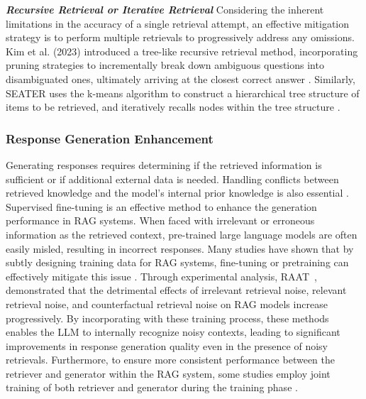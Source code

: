 \textit{\textbf{Recursive Retrieval or Iterative Retrieval}}
Considering the inherent limitations in the accuracy of a single retrieval attempt, an effective mitigation strategy is to perform multiple retrievals to progressively address any omissions. Kim et al. (2023) introduced a tree-like recursive retrieval method, incorporating pruning strategies to incrementally break down ambiguous questions into disambiguated ones, ultimately arriving at the closest correct answer \cite{kim2023tree}. Similarly, SEATER uses the k-means algorithm to construct a hierarchical tree structure of items to be retrieved, and iteratively recalls nodes within the tree structure \cite{si2023generative}.



\subsubsection{Response Generation Enhancement}
Generating responses requires determining if the retrieved information is sufficient or if additional external data is needed. Handling conflicts between retrieved knowledge and the model's internal prior knowledge is also essential \cite{wu2024faithful, ding2024retrieve, tan2024blinded}. Supervised fine-tuning is an effective method to enhance the generation performance in RAG systems. When faced with irrelevant or erroneous information as the retrieved context, pre-trained large language models are often easily misled, resulting in incorrect responses. Many studies have shown that by subtly designing training data for RAG systems, fine-tuning or pretraining can effectively mitigate this issue \cite{wang2023instructretro, yoran2023making, fang2024enhancing}. Through experimental analysis, RAAT~\cite{fang2024enhancing}, demonstrated that the detrimental effects of irrelevant retrieval noise, relevant retrieval noise, and counterfactual retrieval noise on RAG models increase progressively. By incorporating with these training process, these methods enables the LLM to internally recognize noisy contexts, leading to significant improvements in response generation quality even in the presence of noisy retrievals. Furthermore, to ensure more consistent performance between the retriever and generator within the RAG system, some studies employ joint training of both retriever and generator during the training phase \cite{lin2023ra, hofstatter2023fid, asai2023self}.
